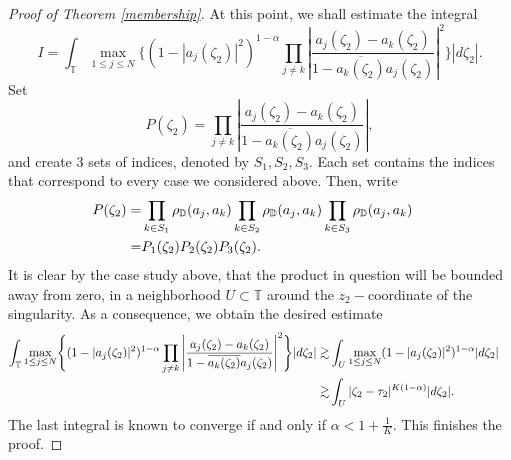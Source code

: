 \documentclass[11pt]{amsart}
\numberwithin{equation}{section}
\begin{document}
\begin{proof}[Proof of Theorem \ref{membership}]
At this point, we shall estimate the integral 
$$I=\int_{\mathbb{T}}\max_{1\leq j\leq N}\Biggl\{(1-|a_j(\zeta_2)|^2)^{1-\alpha}\prod_{j\neq k}\left|\frac{a_{j}(\zeta_2)-a_{k}(\zeta_2)}{1-\overline{a_k(\zeta_2)}a_{j}(\zeta_2)}\right|^2\Biggr\}|d\zeta_2|.$$
Set $$P(\zeta_2)=\prod_{j\neq k}\left|\frac{a_{j}(\zeta_2)-a_{k}(\zeta_2)}{1-\overline{a_{k}(\zeta_2)}a_{j}(\zeta_2)}\right|,$$
and create 3 sets of indices, denoted by $S_1,S_2,S_3.$ Each set contains the indices that correspond to every case we considered above. Then, write
\begin{align}
P(\zeta_2)=&\prod_{k\in S_1}\rho_{\mathbb{D}}(a_j,a_k) \prod_{k\in S_2}\rho_{\mathbb{D}}(a_j,a_k) \prod_{k\in S_3}\rho_{\mathbb{D}}(a_j,a_k) &&\\
=&P_1(\zeta_2)P_2(\zeta_2)P_3(\zeta_2). \notag
\end{align}
It is clear by the case study above, that the product in question will be bounded away from zero, in a neighborhood $U\subset \mathbb{T}$ around the $z_2-$coordinate of the singularity. As a consequence, we obtain the desired estimate
\begin{align}
\int_{\mathbb{T}}\max_{1\leq j\leq N}\Biggl\{(1-|a_j(\zeta_2)|^2)^{1-\alpha}\prod_{j\neq k}\left|\frac{a_{j}(\zeta_2)-a_{k}(\zeta_2)}{1-\overline{a_{k}(\zeta_2)}a_{j}(\zeta_2)}\right|^2\Biggr\}|d\zeta_2|\gtrsim &\int_{U}\max_{1\leq j\leq N}(1-|a_j(\zeta_2)|^2)^{1-\alpha}|d\zeta_2|&&\\
\gtrsim&\int_{U}|\zeta_2-\tau_2|^{K(1-\alpha)}|d\zeta_2|.\notag
\end{align}
The last integral is known to converge if and only if $\alpha<1+\frac{1}{K}.$ This finishes the proof.
\end{proof}
\end{document}
